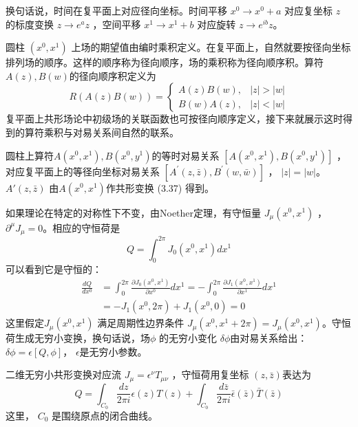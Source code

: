 换句话说，时间在复平面上对应径向坐标。时间平移 $x^0\to x^0+a$ 对应复坐标 $z$ 的标度变换 $z\to e^a z$ ，空间平移 $x^1\to x^1+b$ 对应旋转 $z\to e^{ib}z $。

圆柱 $(x^0,x^1)$ 上场的期望值由编时乘积定义。在复平面上，自然就要按径向坐标排列场的顺序。这样的顺序称为径向顺序，场的乘积称为径向顺序积。算符 $A(z),B(w) $的径向顺序积定义为
\begin{equation}
	R(A(z) B(w))=\left\{\begin{array}{ll} A(z) B(w), & |z|>|w| \\ B(w) A(z), & |z|<|w| \end{array}\right.
\end{equation}
复平面上共形场论中初级场的关联函数也可按径向顺序定义，接下来就展示这时得到的算符乘积与对易关系间自然的联系。

圆柱上算符$ A(x^0,x^1),B(x^0,y^1) $的等时对易关系 $[A(x^0,x^1),B(x^0,y^1)]$ ，对应复平面上的等径向坐标对易关系 $\left[A^{\prime}(z, \bar{z}), B^{\prime}(w, \bar{w})\right]$ ， $|z|=|w| $。 $A'(z,\bar{z})$ 由$ A(x^0,x^1) $作共形变换 (3.37) 得到。

如果理论在特定的对称性下不变，由Noether定理，有守恒量 $J_\mu(x^0,x^1)$ ，$ \partial^\mu J_\mu=0 $。相应的守恒荷是
\begin{equation}
	Q=\int_{0}^{2 \pi} J_{0}\left(x^{0}, x^{1}\right) d x^{1}
\end{equation}
可以看到它是守恒的：
\begin{equation}
	\begin{aligned} \frac{d Q}{d x^{0}} &=\int_{0}^{2 \pi} \frac{\partial J_{0}\left(x^{0}, x^{1}\right)}{\partial x^{0}} d x^{1}=-\int_{0}^{2 \pi} \frac{\partial J_{1}\left(x^{0}, x^{1}\right)}{\partial x^{1}} d x^{1} \\ &=-J_{1}\left(x^{0}, 2 \pi\right)+J_{1}\left(x^{0}, 0\right)=0 \end{aligned}
\end{equation}
这里假定$ J_\mu(x^0,x^1)$ 满足周期性边界条件 $J_\mu(x^0,x^1+2\pi)=J_\mu(x^0,x^1) $。守恒荷生成无穷小变换，换句话说，场$ \phi$ 的无穷小变化 $\delta \phi $由对易关系给出： $\delta \phi=\epsilon[Q,\phi] $， $\epsilon $是无穷小参数。

二维无穷小共形变换对应流 $J_\mu=\epsilon^\nu T_{\mu\nu}$ ，守恒荷用复坐标 $(z,\bar{z}) $表达为
\begin{equation}
	Q=\int_{C_{0}} \frac{d z}{2 \pi i} \epsilon(z) T(z)+\int_{C_{0}} \frac{d \bar{z}}{2 \pi i} \bar{\epsilon}(\bar{z}) \bar{T}(\bar{z})
\end{equation}
这里， $C_0$ 是围绕原点的闭合曲线。


